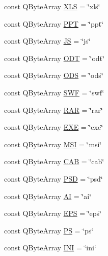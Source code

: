 \begin{DoxyCompactItemize}
\item 
const Q\+Byte\+Array \hyperlink{namespace_f_i_l_e___e_x_t_e_n_t_i_o_n_a0dc845be160949b21790d6d2f2bf199f}{X\+LS} = \char`\"{}xls\char`\"{}
\item 
const Q\+Byte\+Array \hyperlink{namespace_f_i_l_e___e_x_t_e_n_t_i_o_n_a490e9f27bd2b74148a9422a50f73cc57}{P\+PT} = \char`\"{}ppt\char`\"{}
\item 
const Q\+Byte\+Array \hyperlink{namespace_f_i_l_e___e_x_t_e_n_t_i_o_n_a362799b61a8049ff333189c047fcee5d}{JS} = \char`\"{}js\char`\"{}
\item 
const Q\+Byte\+Array \hyperlink{namespace_f_i_l_e___e_x_t_e_n_t_i_o_n_aa274932bc94ca656069ff88d1c458287}{O\+DT} = \char`\"{}odt\char`\"{}
\item 
const Q\+Byte\+Array \hyperlink{namespace_f_i_l_e___e_x_t_e_n_t_i_o_n_a4ff8935f5f4ccb155466cbe583fc5175}{O\+DS} = \char`\"{}ods\char`\"{}
\item 
const Q\+Byte\+Array \hyperlink{namespace_f_i_l_e___e_x_t_e_n_t_i_o_n_a9372718a8525da7699e2b26b276c3413}{S\+WF} = \char`\"{}swf\char`\"{}
\item 
const Q\+Byte\+Array \hyperlink{namespace_f_i_l_e___e_x_t_e_n_t_i_o_n_ab3dd8f6cc9bbfafb2b85cea2753e97b5}{R\+AR} = \char`\"{}rar\char`\"{}
\item 
const Q\+Byte\+Array \hyperlink{namespace_f_i_l_e___e_x_t_e_n_t_i_o_n_afa13b74dc29f851a3fa6e791463864b3}{E\+XE} = \char`\"{}exe\char`\"{}
\item 
const Q\+Byte\+Array \hyperlink{namespace_f_i_l_e___e_x_t_e_n_t_i_o_n_a56c42df12aed0d43b7f6852e48f4ba81}{M\+SI} = \char`\"{}msi\char`\"{}
\item 
const Q\+Byte\+Array \hyperlink{namespace_f_i_l_e___e_x_t_e_n_t_i_o_n_a206f2fa88ec2f9859fd76d9b8bcc4abb}{C\+AB} = \char`\"{}cab\char`\"{}
\item 
const Q\+Byte\+Array \hyperlink{namespace_f_i_l_e___e_x_t_e_n_t_i_o_n_a9802e1105a218c2483aedf1d8ec7e9fa}{P\+SD} = \char`\"{}psd\char`\"{}
\item 
const Q\+Byte\+Array \hyperlink{namespace_f_i_l_e___e_x_t_e_n_t_i_o_n_a25920a050a15f85778d9a0b3b062ebf0}{AI} = \char`\"{}ai\char`\"{}
\item 
const Q\+Byte\+Array \hyperlink{namespace_f_i_l_e___e_x_t_e_n_t_i_o_n_aa9b7206f7da66264c8d9eec3d4cae06c}{E\+PS} = \char`\"{}eps\char`\"{}
\item 
const Q\+Byte\+Array \hyperlink{namespace_f_i_l_e___e_x_t_e_n_t_i_o_n_a2b696ec0915cd799520060e65ad47a28}{PS} = \char`\"{}ps\char`\"{}
\item 
const Q\+Byte\+Array \hyperlink{namespace_f_i_l_e___e_x_t_e_n_t_i_o_n_a06bdd7b9d2e1ef684f75e0a38c2e0229}{I\+NI} = \char`\"{}ini\char`\"{}
\end{DoxyCompactItemize}


